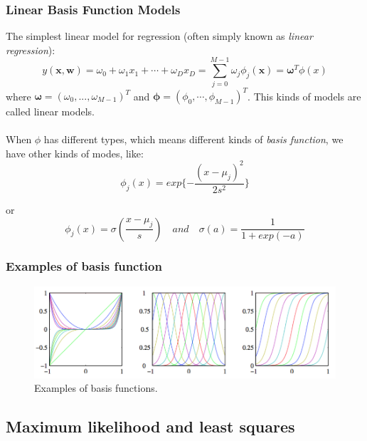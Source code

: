 \documentclass{beamer}
\begin{document}
\begin{frame}
\frametitle{Linear Basis Function Models}


 The simplest linear model for regression (often simply known as \textit{linear regression}):
\begin{equation}
y(\bm{x},\bm{w})=\omega_0+\omega_1x_1+\cdots+\omega_Dx_D = \sum_{j=0}^{M-1}\omega_j\phi_j(\bm{x})=\bm{\omega}^T\phi(x)
\end{equation}
where $\bm{\omega}=(\omega_0,...,\omega_{M-1})^T$ and $\bm{\phi}=(\phi_0,\cdots,\phi_{M-1})^T$. This kinds of models are called linear models.\\~\\

 When $\phi$ has different types, which means different kinds of \textit{basis function}, we have other kinds of modes, like:
\begin{equation}
\phi_j(x) = exp\{-\frac{(x-\mu_j)^2}{2s^2}\}
\end{equation}

or
\begin{equation}
\phi_j(x) = \sigma(\frac{x-\mu_j}{s}) \quad and \quad \sigma(a) = \frac{1}{1+exp(-a)}
\end{equation} 

\end{frame}

\begin{frame}
\frametitle{Examples of basis function}
\begin{figure}
\includegraphics[width=12cm]{Figure1}
\caption{Examples of basis functions.}
\end{figure}
\end{frame}

\subsection{Maximum likelihood and least squares} 


\end{document}

